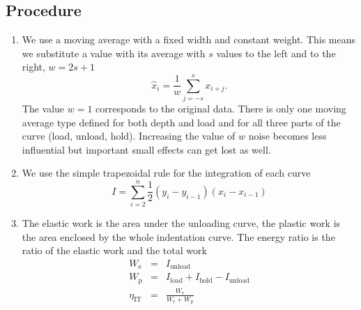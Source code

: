 \subsection{Procedure} \label{work_calc}
\begin{enumerate}
 \item 
We use a moving average with a fixed width and constant weight. This means we substitute a value with its average with $s$ values to the left and to the right, $w = 2s + 1$ 
$$
\hat{x} _i = \frac1w \sum_{j = -s}^{s} x_{i+j}.
$$
The value $w = 1$ corresponds to the original data. There is only one moving average type defined for both depth and load and for all three parts of the curve (load, unload, hold).
Increasing the value of $w$ noise becomes less influential but important small effects can get lost as well. 
\item
We use the simple trapezoidal rule for the integration of each curve
\begin{equation}
 I = \sum_{i=2}^n \frac12 (y_{i}-y_{i-1}) (x_{i}-x_{i-1}) 
\end{equation}
\item
The elastic work is the area under the unloading curve, the plastic work is the area enclosed by the whole indentation curve. The energy ratio is the ratio of the elastic work and the total work
\begin{eqnarray}
 W_{\mathrm{e}} &=& I_{\mathrm{unload}} \nonumber \\
 W_{\mathrm{p}} &=& I_{\mathrm{load}} + I_{\mathrm{hold}} - I_{\mathrm{unload}} \nonumber \\
 \eta_{\mathrm{IT}} &=& \frac{W_{\mathrm{e}}}{W_{\mathrm{e}}+ W_{\mathrm{p}}}\nonumber \\
\end{eqnarray}
\end{enumerate}

